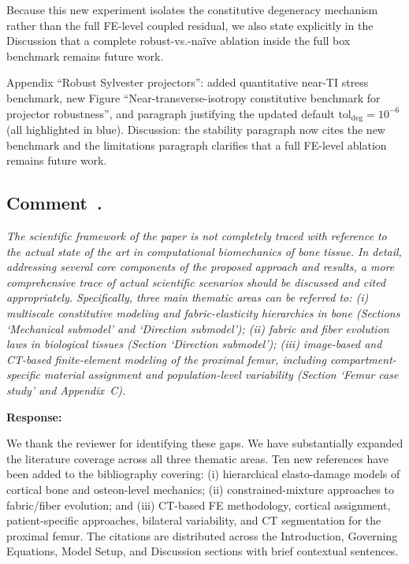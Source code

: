\documentclass[11pt,a4paper]{article}
\newcounter{reviewer}
\newcounter{comment}[reviewer]
\newcommand{\revcomment}[1]{%
  \refstepcounter{comment}%
  \subsection*{Comment~\thereviewer.\thecomment}%
  {\color{reviewerblue}\itshape #1}%
  \medskip
}
\newcommand{\response}{%
  \par\noindent\textbf{Response:}\par\noindent\color{responseblack}%
}
\newcommand{\change}{%
  \par\noindent{\color{blue}\textbf{Change in manuscript:}}\par\noindent\color{blue}%
}
\begin{document}
Because this new experiment isolates the constitutive degeneracy mechanism rather than the full FE-level coupled residual, we also state explicitly in the Discussion that a complete robust-vs.-na\"ive ablation inside the full box benchmark remains future work.

\change
Appendix ``Robust Sylvester projectors'': added quantitative near-TI stress benchmark, new Figure ``Near-transverse-isotropy constitutive benchmark for projector robustness'', and paragraph justifying the updated default $\mathrm{tol}_{\mathrm{deg}}=10^{-6}$ (all highlighted in blue). Discussion: the stability paragraph now cites the new benchmark and the limitations paragraph clarifies that a full FE-level ablation remains future work.


\revcomment{The scientific framework of the paper is not completely traced with reference to the actual state of the art in computational biomechanics of bone tissue. In detail, addressing several core components of the proposed approach and results, a more comprehensive trace of actual scientific scenarios should be discussed and cited appropriately. Specifically, three main thematic areas can be referred to: (i) multiscale constitutive modeling and fabric-elasticity hierarchies in bone (Sections `Mechanical submodel' and `Direction submodel'); (ii) fabric and fiber evolution laws in biological tissues (Section `Direction submodel'); (iii) image-based and CT-based finite-element modeling of the proximal femur, including compartment-specific material assignment and population-level variability (Section `Femur case study' and Appendix~C).}

\response
We thank the reviewer for identifying these gaps. We have substantially expanded the literature coverage across all three thematic areas. Ten new references have been added to the bibliography covering: (i) hierarchical elasto-damage models of cortical bone and osteon-level mechanics; (ii) constrained-mixture approaches to fabric/fiber evolution; and (iii) CT-based FE methodology, cortical assignment, patient-specific approaches, bilateral variability, and CT segmentation for the proximal femur. The citations are distributed across the Introduction, Governing Equations, Model Setup, and Discussion sections with brief contextual sentences.
\end{document}
